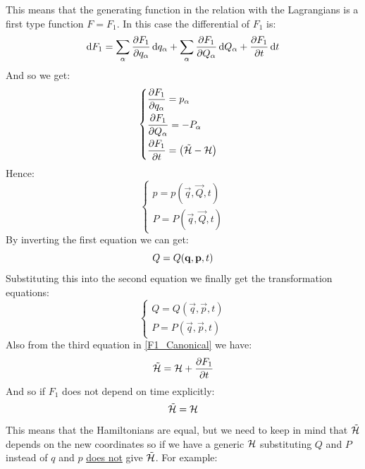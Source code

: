 This means that the generating function in the relation with the Lagrangians is a first type function $F = F_1$. In this case the differential of $F_1$ is:
\begin{equation}
    \dd{F_1} = \bigsum_{\alpha} \pdv{F_1}{q_{\alpha}} \dd{q_{\alpha}} + \bigsum_{\alpha} \pdv{F_1}{Q_{\alpha}} \dd{Q_{\alpha}} + \pdv{F_1}{t} \dd{t}
\end{equation}
And so we get:
\begin{equation} \label{F1_Canonical}
    \begin{cases}
        \pdv{F_1}{q_{\alpha}} = p_{\alpha}\\[8pt]
        \pdv{F_1}{Q_{\alpha}} = -P_{\alpha}\\[8pt]
        \pdv{F_1}{t} = \brackets{\tilde{\hamfun}- \hamfun}
    \end{cases}
\end{equation}
Hence:
\begin{equation}
    \begin{cases}
        p = p(\vec{q},\vec{Q},t)\\[8pt]
        P = P(\vec{q},\vec{Q},t)
    \end{cases}
\end{equation}
By inverting the first equation we can get:
\begin{equation}
    Q = Q(\vec{q},\vec{p},t)\\[8pt]
\end{equation}
Substituting this into the second equation we finally get the transformation equations:
\begin{equation}
    \begin{cases}
        Q = Q(\vec{q},\vec{p},t)\\[8pt]
        P = P(\vec{q},\vec{p},t)
    \end{cases}
\end{equation}
Also from the third equation in \eqref{F1_Canonical} we have:
\begin{equation}
    \tilde{\hamfun} = \hamfun + \pdv{F_1}{t}
\end{equation}
And so if $F_1$ does not depend on time explicitly:
\begin{equation}
    \tilde{\hamfun} = \hamfun
\end{equation}
This means that the Hamiltonians are equal, but we need to keep in mind that $\tilde{\hamfun}$ depends on the new coordinates so if we have a generic $\hamfun$ substituting $Q$ and $P$ instead of $q$ and $p$ \underline{does not} give $\tilde{\hamfun}$. For example:
